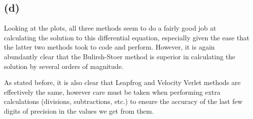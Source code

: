 \documentclass[12pt]{article}
\begin{document}
\subsection*{(d)}

Looking at the plots, all three methods seem to do a fairly good job at
calculating the solution to this differential equation, especially given the
ease that the latter two methods took to code and perform. However, it is again
abundantly clear that the Bulirsh-Stoer method is superior in calculating the
solution by several orders of magnitude.

As stated before, it is also clear that Leapfrog and Velocity Verlet methods
are effectively the same, however care must be taken when performing extra
calculations (divisions, subtractions, etc.) to ensure the accuracy of the last
few digits of precision in the values we get from them.
\end{document}
